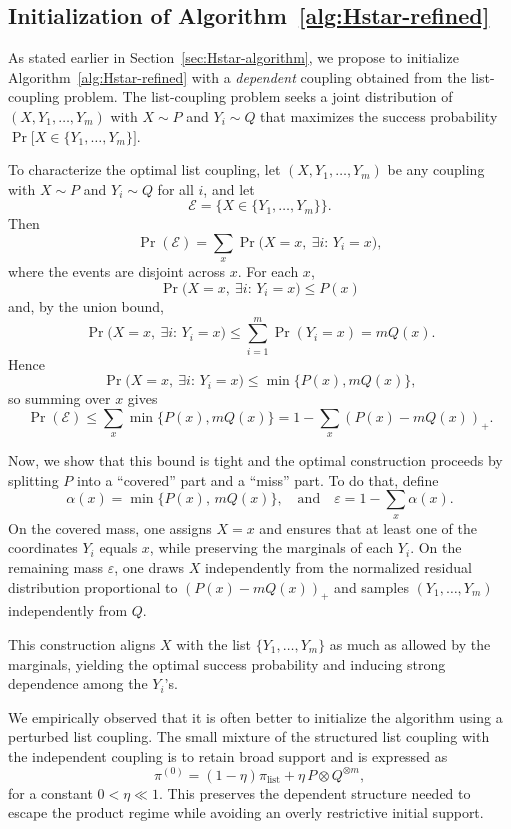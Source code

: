 \documentclass[journal]{IEEEtran}
\newcommand{\1}{\mathbf{1}}
\begin{document}
\subsection{Initialization of Algorithm~\ref{alg:Hstar-refined}}\label{app:list-coupling}
As stated earlier in Section~\ref{sec:Hstar-algorithm}, we propose to initialize Algorithm~\ref{alg:Hstar-refined} with a \textit{dependent} coupling obtained from the list-coupling problem. The list-coupling problem seeks a joint distribution of $(X,Y_1,\dots,Y_m)$ with $X\sim P$ and $Y_i\sim Q$ that maximizes the success probability $\Pr\big[X\in\{Y_1,\dots,Y_m\}\big].$ 

To characterize the optimal list coupling, let $(X,Y_1,\dots,Y_m)$ be any coupling with $X\sim P$ and $Y_i\sim Q$ for all $i$, and let
$$\mathcal E=\{X\in\{Y_1,\dots,Y_m\}\}.$$
Then
$$\Pr(\mathcal E)=\sum_x \Pr\big(X=x,\ \exists i:\,Y_i=x\big),$$
where the events are disjoint across $x$. For each $x$,
$$\Pr\big(X=x,\ \exists i:\,Y_i=x\big)\le P(x)$$
and, by the union bound,
$$\Pr\big(X=x,\ \exists i:\,Y_i=x\big)\le \sum_{i=1}^m \Pr(Y_i=x)=mQ(x).$$
Hence
$$\Pr\big(X=x,\ \exists i:\,Y_i=x\big)\le \min\{P(x),mQ(x)\},$$
so summing over $x$ gives
$$\Pr(\mathcal E)\le \sum_x \min\{P(x),mQ(x)\}=1-\sum_x (P(x)-mQ(x))_+.$$

Now, we show that this bound is tight and the optimal construction proceeds by splitting $P$ into a ``covered'' part and a ``miss'' part. To do that, define
$$\alpha(x)=\min\{P(x),\,mQ(x)\}, \quad\text{and}\quad  \varepsilon=1-\sum_x \alpha(x).$$
On the covered mass, one assigns $X=x$ and ensures that at least one of the coordinates $Y_i$ equals $x$, while preserving the marginals of each $Y_i$. On the remaining mass $\varepsilon$, one draws $X$ independently from the normalized residual distribution proportional to $(P(x)-mQ(x))_+$ and samples $(Y_1,\dots,Y_m)$ independently from $Q$.

This construction aligns $X$ with the list $\{Y_1,\dots,Y_m\}$ as much as allowed by the marginals, yielding the optimal success probability and inducing strong dependence among the $Y_i$'s.

We empirically observed that it is often better to initialize the algorithm using a perturbed list coupling. The small mixture of the structured list  coupling with the independent coupling is to retain broad support and is expressed as 
\begin{equation}\label{eq:listcouplingMixture}
    \pi^{(0)}=(1-\eta)\pi_{\mathrm{list}}+\eta\,P\otimes Q^{\otimes m}, 
\end{equation}
for a constant $0<\eta\ll1$. This preserves the dependent structure needed to escape the product regime while avoiding an overly restrictive initial support. 
\end{document}
